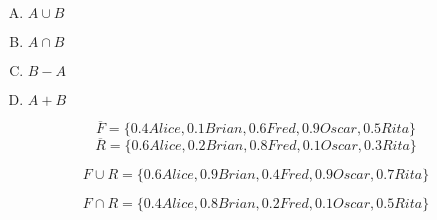 {{        %
        \begin{practices}
            \begin{enumerate}[A.]
                \item $A \cup B$
                \item $A \cap B$
                \item $B - A$
                \item $A + B$
            \end{enumerate}
        \end{practices}

        \begin{practices}
            $$\overline{F} = \{0.4 Alice, 0.1 Brian, 0.6 Fred, 0.9 Oscar, 0.5 Rita\}$$
            $$\overline{R} = \{0.6 Alice, 0.2 Brian, 0.8 Fred, 0.1 Oscar, 0.3 Rita\}$$
        \end{practices}

        \begin{practices}
            $$F \cup R = \{0.6 Alice, 0.9 Brian, 0.4 Fred, 0.9 Oscar, 0.7 Rita\}$$
        \end{practices}

        \begin{practices}
            $$F \cap R = \{0.4 Alice, 0.8 Brian, 0.2 Fred, 0.1 Oscar, 0.5 Rita\}$$
        \end{practices}
    }
}
